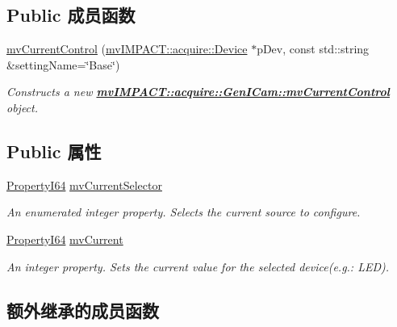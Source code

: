 \subsection*{Public 成员函数}
\begin{DoxyCompactItemize}
\item 
\hyperlink{classmv_i_m_p_a_c_t_1_1acquire_1_1_gen_i_cam_1_1mv_current_control_af1a0d0f594b96ca4daf76a1178f82496}{mv\+Current\+Control} (\hyperlink{classmv_i_m_p_a_c_t_1_1acquire_1_1_device}{mv\+I\+M\+P\+A\+C\+T\+::acquire\+::\+Device} $\ast$p\+Dev, const std\+::string \&setting\+Name=\char`\"{}Base\char`\"{})
\begin{DoxyCompactList}\small\item\em Constructs a new {\bfseries \hyperlink{classmv_i_m_p_a_c_t_1_1acquire_1_1_gen_i_cam_1_1mv_current_control}{mv\+I\+M\+P\+A\+C\+T\+::acquire\+::\+Gen\+I\+Cam\+::mv\+Current\+Control}} object. \end{DoxyCompactList}\end{DoxyCompactItemize}
\subsection*{Public 属性}
\begin{DoxyCompactItemize}
\item 
\hyperlink{group___common_interface_ga81749b2696755513663492664a18a893}{Property\+I64} \hyperlink{classmv_i_m_p_a_c_t_1_1acquire_1_1_gen_i_cam_1_1mv_current_control_ab00b8204becd1be4ce0ca8a72193c9f8}{mv\+Current\+Selector}
\begin{DoxyCompactList}\small\item\em An enumerated integer property. Selects the current source to configure. \end{DoxyCompactList}\item 
\hyperlink{group___common_interface_ga81749b2696755513663492664a18a893}{Property\+I64} \hyperlink{classmv_i_m_p_a_c_t_1_1acquire_1_1_gen_i_cam_1_1mv_current_control_aabd9b5d8fd7610d1ca02fd34cf6836bc}{mv\+Current}
\begin{DoxyCompactList}\small\item\em An integer property. Sets the current value for the selected device(e.\+g.\+: L\+E\+D). \end{DoxyCompactList}\end{DoxyCompactItemize}
\subsection*{额外继承的成员函数}


